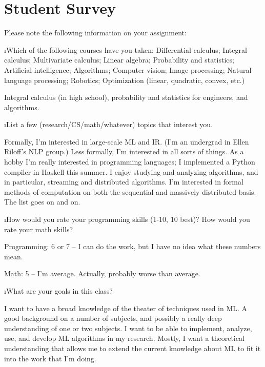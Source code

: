 \documentclass[fleqn]{article}
\begin{document}

\section{Student Survey}

Please note the following information on your assignment:

\bee
\i Which of the following courses have you taken:
     Differential calculus;
     Integral calculus;
     Multivariate calculus;
     Linear algebra;
     Probability and statistics;
     Artificial intelligence;
     Algorithms;
     Computer vision;
     Image processing;
     Natural language processing;
     Robotics;
     Optimization (linear, quadratic, convex, etc.)


 \begin{solution}
   Integral calculus (in high school), probability and statistics for engineers, and algorithms.
 \end{solution}

\i List a few (research/CS/math/whatever) topics that interest you.

 \begin{solution}
   Formally, I'm interested in large-scale ML and IR. (I'm an undergrad in Ellen Riloff's NLP group.) Less formally, I'm interested in all sorts of things. As a hobby I'm really interested in programming languages; I implemented a Python compiler in Haskell this summer. I enjoy studying and analyzing algorithms, and in particular, streaming and distributed algorithms. I'm interested in formal methods of computation on both the sequential and massively distributed basis. The list goes on and on.
 \end{solution}

\i How would you rate your programming skills (1-10, 10 best)?  How would you rate your math skills?

 \begin{solution}
   Programming: 6 or 7 -- I can do the work, but I have no idea what these numbers mean.
 
   Math: 5 -- I'm average. Actually, probably worse than average.
 \end{solution}

\i What are your goals in this class?

 \begin{solution}
   I want to have a broad knowledge of the theater of techniques used in ML. A good background on a number of subjects, and possibly a really deep understanding of one or two subjects. I want to be able to implement, analyze, use, and develop ML algorithms in my research. Mostly, I want a theoretical understanding that allows me to extend the current knowledge about ML to fit it into the work that I'm doing.
 \end{solution}
\end{document}
